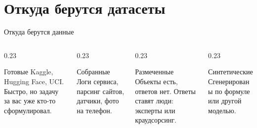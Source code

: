 \section{Откуда берутся датасеты}

\begin{frame}[c]{Откуда берутся данные}
  \begin{columns}[T]
    \begin{column}{0.23\textwidth}
      \begin{block}{Готовые}
        \small
        Kaggle, Hugging Face, UCI. Быстро, но задачу за вас уже кто-то сформулировал.
      \end{block}
    \end{column}
    \begin{column}{0.23\textwidth}
      \begin{block}{Собранные}
        \small
        Логи сервиса, парсинг сайтов, датчики, фото на телефон.
      \end{block}
    \end{column}
    \begin{column}{0.23\textwidth}
      \begin{block}{Размеченные}
        \small
        Объекты есть, ответов нет. Ответы ставят люди: эксперты или краудсорсинг.
      \end{block}
    \end{column}
    \begin{column}{0.23\textwidth}
      \begin{block}{Синтетические}
        \small
        Сгенерированы по формуле или другой моделью.
      \end{block}
    \end{column}
  \end{columns}

  \medskip
\end{frame}

